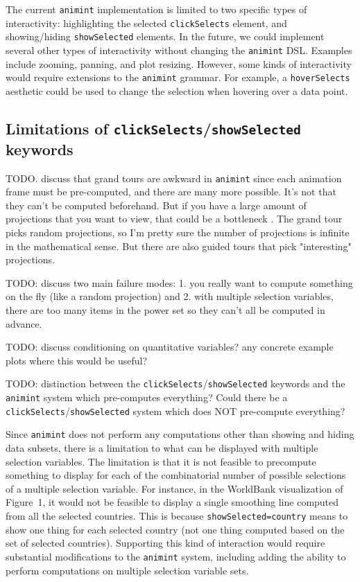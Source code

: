 \documentclass[12pt]{article}\usepackage[]{graphicx}\usepackage[]{color}
\begin{document}
The current \texttt{animint} implementation is limited to two specific types of
interactivity: highlighting the selected \texttt{clickSelects}
element, and showing/hiding \texttt{showSelected} elements. In the
future, we could implement several other types of interactivity
without changing the \texttt{animint} DSL. Examples include zooming,
panning, and plot resizing. However, some
kinds of interactivity would require extensions to the \texttt{animint}
grammar. For example, a \texttt{hoverSelects} aesthetic
could be used to change the selection when hovering over a data point.

\subsection{Limitations of \texttt{clickSelects}/\texttt{showSelected} keywords}

TODO. discuss that grand tours are awkward in \texttt{animint} since each
animation frame must be pre-computed, and there are many more possible.
It's not that they can't be computed beforehand. But if you have a
large amount of projections that you want to view, that could be a
bottleneck \citep{tourr}. The grand tour picks random projections, so
I'm pretty sure the number of projections is infinite in the
mathematical sense. But there are also guided tours that pick
"interesting" projections.

TODO: discuss two main failure modes: 1. you really want to compute
something on the fly (like a random projection) and 2. with multiple
selection variables, there are too many items in the power set so they
can't all be computed in advance.

TODO: discuss conditioning on quantitative variables? any concrete
example plots where this would be useful? 

TODO: distinction between the \texttt{clickSelects}/\texttt{showSelected} keywords and
the \texttt{animint} system which pre-computes everything? Could there be a
\texttt{clickSelects}/\texttt{showSelected} system which does NOT pre-compute
everything?

Since \texttt{animint} does not perform any computations other than showing and
hiding data subsets, there is a limitation to what can be
displayed with multiple selection variables.
The limitation is that it is not feasible to precompute
something to display for each of the combinatorial number of
possible selections
of a multiple selection variable.
For instance, in the
WorldBank visualization of Figure~1, it would not be feasible to
display a single smoothing line computed from all the selected
countries. This is because \texttt{showSelected=country} means to show
one thing for each selected country (not one thing computed based on
the set of selected countries). Supporting this kind of interaction
would require substantial modifications to the \texttt{animint} system,
including adding the ability to perform computations on
multiple selection variable sets.
\end{document}
